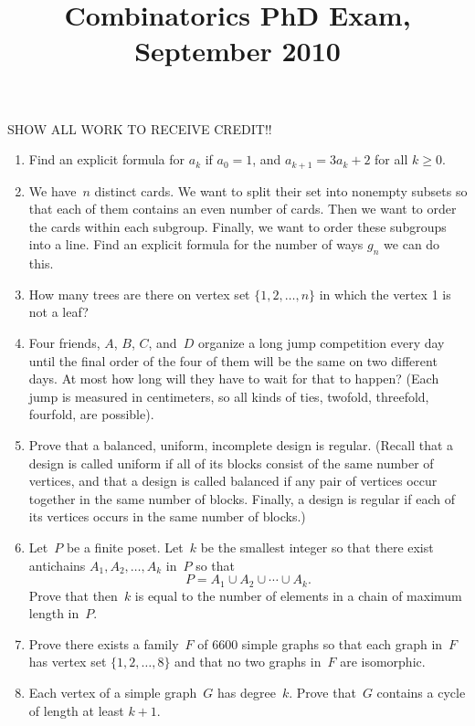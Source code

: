 \documentclass[11pt,letterpaper]{article}
\title{Combinatorics PhD Exam, September 2010}
\author{}
\date{}
\newenvironment{examproblems}[2]{%
  \def\ProblemHeadingTag{#2}%
  \AssignTaggingSocketPlug{block/list/label}{examproblem}%
  \begin{enumerate}%
  \setcounter{enumi}{#1}%
  \renewcommand{\labelenumi}{\textbf{\theenumi.}}%
  \setlength{\topsep}{0.35em}%
  \setlength{\partopsep}{0pt}%
  \setlength{\itemsep}{0.48em}%
  \setlength{\parsep}{0.18em}%
}{\end{enumerate}}
\newenvironment{examinstructions}{%
  \par\begingroup\itshape
}{%
  \par\endgroup\vspace{0.18em}
}
\begin{document}
\maketitle
\thispagestyle{empty}
\begin{examinstructions}
SHOW ALL WORK TO RECEIVE CREDIT!!
\end{examinstructions}
\begin{examproblems}{0}{H2}
\def\ProblemHeadingText{Problem 1.}
\item
Find an explicit formula for \(a_k\) if \(a_0=1\), and \(a_{k+1}=3a_k+2\) for all \(k\ge 0\).
\def\ProblemHeadingText{Problem 2.}
\item
We have~\(n\) distinct cards. We want to split their set into nonempty subsets so that each of them contains an even number of cards. Then we want to order the cards within each subgroup. Finally, we want to order these subgroups into a line. Find an explicit formula for the number of ways \(g_n\) we can do this.
\def\ProblemHeadingText{Problem 3.}
\item
How many trees are there on vertex set \(\{1,2,\ldots,n\}\) in which the vertex 1 is not a leaf?
\def\ProblemHeadingText{Problem 4.}
\item
Four friends, \(A\), \(B\), \(C\), and~\(D\) organize a long jump competition every day until the final order of the four of them will be the same on two different days. At most how long will they have to wait for that to happen? (Each jump is measured in centimeters, so all kinds of ties, twofold, threefold, fourfold, are possible).
\def\ProblemHeadingText{Problem 5.}
\item
Prove that a balanced, uniform, incomplete design is regular. (Recall that a design is called uniform if all of its blocks consist of the same number of vertices, and that a design is called balanced if any pair of vertices occur together in the same number of blocks. Finally, a design is regular if each of its vertices occurs in the same number of blocks.)
\def\ProblemHeadingText{Problem 6.}
\item
Let~\(P\) be a finite poset. Let~\(k\) be the smallest integer so that there exist antichains \(A_1,A_2,\ldots,A_k\) in~\(P\) so that
\[
P=A_1\cup A_2\cup\cdots\cup A_k.
\]
 Prove that then~\(k\) is equal to the number of elements in a chain of maximum length in~\(P\).
\def\ProblemHeadingText{Problem 7.}
\item
Prove there exists a family~\(F\) of 6600 simple graphs so that each graph in~\(F\) has vertex set \(\{1,2,\ldots,8\}\) and that no two graphs in~\(F\) are isomorphic.
\def\ProblemHeadingText{Problem 8.}
\item
Each vertex of a simple graph~\(G\) has degree~\(k\). Prove that~\(G\) contains a cycle of length at least \(k+1\).
\end{examproblems}
\end{document}
